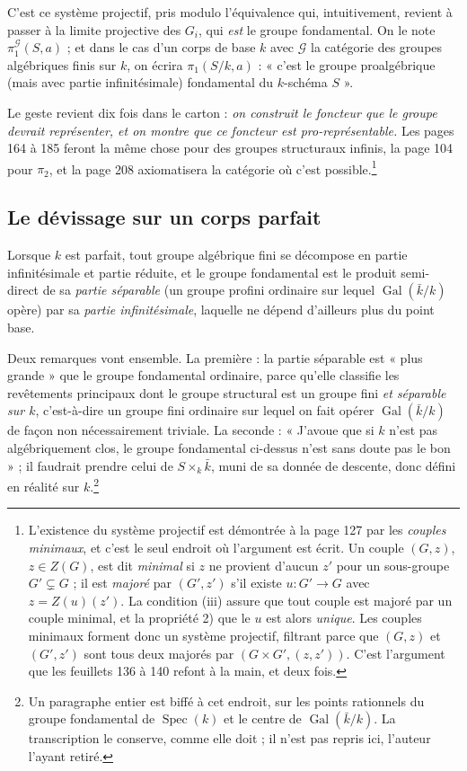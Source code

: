 \documentclass[11pt,a4paper]{article}
\begin{document}
C'est ce système projectif, pris modulo l'équivalence qui, intuitivement,
revient à passer à la limite projective des $G_{i}$, qui \emph{est} le
groupe fondamental. On le note $\pi_{1}^{\mathcal{G}}(S, a)$ ; et dans le cas
d'un corps de base $k$ avec $\mathcal{G}$ la catégorie des groupes algébriques
finis sur $k$, on écrira $\pi_{1}(S/k, a)$ : « c'est le groupe proalgébrique
(mais avec partie infinitésimale) fondamental du $k$-schéma $S$ ».

Le geste revient dix fois dans le carton :
\emph{on construit le foncteur que le groupe devrait
représenter, et on montre que ce foncteur est pro-représentable.} Les pages 164
à 185 feront la même chose pour des groupes structuraux infinis, la page 104
pour $\pi_{2}$, et la page 208 axiomatisera la catégorie où c'est
possible.\footnote{L'existence du système projectif est démontrée à la page 127
par les \emph{couples minimaux}, et c'est le seul endroit où l'argument est
écrit. Un couple $(G, z)$, $z \in Z(G)$, est dit \emph{minimal} si $z$ ne
provient d'aucun $z'$ pour un sous-groupe $G' \subsetneq G$ ; il est
\emph{majoré} par $(G', z')$ s'il existe $u : G' \to G$ avec $z = Z(u)(z')$.
La condition (iii) assure que tout couple est majoré par un couple minimal, et
la propriété 2) que le $u$ est alors \emph{unique}. Les couples minimaux
forment donc un système projectif, filtrant parce que $(G,z)$ et $(G',z')$ sont
tous deux majorés par $(G\times G', (z,z'))$. C'est l'argument que
les feuillets 136 à 140 refont à la main, et deux fois.}

\subsection*{Le dévissage sur un corps parfait}

Lorsque $k$ est parfait, tout groupe algébrique fini se décompose en partie
infinitésimale et partie réduite, et le groupe fondamental est le produit
semi-direct de sa \emph{partie séparable} (un groupe profini ordinaire sur
lequel $\operatorname{Gal}(\bar{k}/k)$ opère) par sa \emph{partie
infinitésimale}, laquelle ne dépend d'ailleurs plus du point base.

Deux remarques vont ensemble. La première : la partie séparable est
« plus grande » que le groupe fondamental ordinaire, parce qu'elle classifie
les revêtements principaux dont le groupe structural est un groupe fini
\emph{et séparable sur $k$}, c'est-à-dire un groupe fini ordinaire sur
lequel on fait opérer $\operatorname{Gal}(\bar{k}/k)$ de façon non
nécessairement triviale. La seconde : « J'avoue que si $k$ n'est pas
algébriquement clos, le groupe fondamental ci-dessus n'est sans doute pas le
bon » ; il faudrait prendre celui de $S \times_{k} \bar{k}$, muni de sa donnée
de descente, donc défini en réalité sur $k$.\footnote{Un paragraphe entier est
biffé à cet endroit, sur les points rationnels du groupe fondamental de
$\operatorname{Spec}(k)$ et le centre de $\operatorname{Gal}(\bar{k}/k)$. La
transcription le conserve, comme elle doit ; il n'est pas repris ici, l'auteur
l'ayant retiré.}
\end{document}

